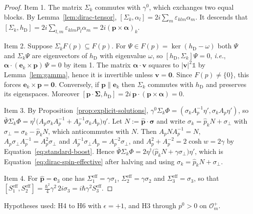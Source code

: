 \begin{proof}
	Item 1. The matrix $\Sigma_k$ commutes with $\gamma^0$, which exchanges two equal blocks. By Lemma~\ref{lem:dirac-tensor}, $[\Sigma_k,\alpha_l]=2i\sum_m\varepsilon_{klm}\alpha_m$. It descends that $[\Sigma_k,h_{\mathrm{D}}]=2i\sum_{l,m}\varepsilon_{klm}p_l\alpha_m=2i(\mathbf{p}\times\boldsymbol{\alpha})_k$.
	
	Item 2. Suppose $\Sigma_kF(p)\subseteq F(p)$. For $\Psi\in F(p)=\ker(h_{\mathrm{D}}-\omega)$ both $\Psi$ and $\Sigma_k\Psi$ are eigenvectors of $h_{\mathrm{D}}$ with eigenvalue $\omega$, so $[h_{\mathrm{D}},\Sigma_k]\Psi=0$, \textit{i.e.}, $\boldsymbol{\alpha}\cdot(\mathbf{e}_k\times\mathbf{p})\,\Psi=0$ by item 1. The matrix $\boldsymbol{\alpha}\cdot\mathbf{v}$ squares to $|\mathbf{v}|^2\mathbb{1}$ by Lemma~\ref{lem:gamma}, hence it is invertible unless $\mathbf{v}=\mathbf{0}$. Since $F(p)\neq\{0\}$, this forces $\mathbf{e}_k\times\mathbf{p}=\mathbf{0}$. Conversely, if $\mathbf{p}\parallel\mathbf{e}_k$ then $\Sigma_k$ commutes with $h_{\mathrm{D}}$ and preserves its eigenspaces. Moreover $[\mathbf{p}\cdot\boldsymbol{\Sigma},h_{\mathrm{D}}]=2i\,\mathbf{p}\cdot(\mathbf{p}\times\boldsymbol{\alpha})=0$.
	
	Item 3. By Proposition~\ref{prop:explicit-solutions}, $\gamma^0\Sigma_k\Phi=(\sigma_kA_p^{-1}\eta',\sigma_kA_p\eta')$, so $\bar\Psi\Sigma_k\Phi=\eta^\dagger\big(A_p\sigma_kA_p^{-1}+A_p^{-1}\sigma_kA_p\big)\eta'$. Let $N:=\hat{\mathbf{p}}\cdot\boldsymbol{\sigma}$ and write $\sigma_k=\hat p_kN+\sigma_\perp$ with $\sigma_\perp=\sigma_k-\hat p_kN$, which anticommutes with $N$. Then $A_pNA_p^{-1}=N$, $A_p\sigma_\perp A_p^{-1}=A_p^2\sigma_\perp$ and $A_p^{-1}\sigma_\perp A_p=A_p^{-2}\sigma_\perp$, and $A_p^2+A_p^{-2}=2\cosh w=2\gamma$ by Equation~\eqref{eq:standard-boost}. Hence $\bar\Psi\Sigma_k\Phi=2\eta^\dagger\big(\hat p_kN+\gamma\sigma_\perp\big)\eta'$, which is Equation~\eqref{eq:dirac-spin-effective} after halving and using $\sigma_k=\hat p_kN+\sigma_\perp$.
	
	Item 4. For $\hat{\mathbf{p}}=\mathbf{e}_3$ one has $\Sigma_1^{\mathrm{eff}}=\gamma\sigma_1$, $\Sigma_2^{\mathrm{eff}}=\gamma\sigma_2$ and $\Sigma_3^{\mathrm{eff}}=\sigma_3$, so that $[S^{\mathrm{eff}}_1,S^{\mathrm{eff}}_2]=\frac{\hbar^2}4\gamma^2\,2i\sigma_3=i\hbar\gamma^2S^{\mathrm{eff}}_3$.
\end{proof}

\noindent Hypotheses used: H4 to H6 with $\epsilon=+1$, and H3 through $p^0>0$ on $\mathcal{O}_m^+$.


